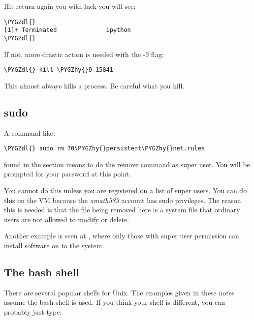\documentclass[letterpaper,10pt,english]{sphinxmanual}
\def\PYGZdl{\char`\$}
\def\PYGZhy{\char`\-}
\begin{document}
Hit return again you with luck you will see:

\begin{Verbatim}[commandchars=\\\{\}]
\PYGZdl{}
[1]+ Terminated              ipython
\PYGZdl{}
\end{Verbatim}

If not, more drastic action is needed with the -9 flag:

\begin{Verbatim}[commandchars=\\\{\}]
\PYGZdl{} kill \PYGZhy{}9 15841
\end{Verbatim}

This almost always kills a process.  Be careful what you kill.


\subsection{sudo}
\label{unix:sudo}\label{unix:id2}
A command like:

\begin{Verbatim}[commandchars=\\\{\}]
\PYGZdl{} sudo rm 70\PYGZhy{}persistent\PYGZhy{}net.rules
\end{Verbatim}

found in the section {\hyperref[vm:vm]{}} means to do the remove command as super user.
You will be prompted for your password at this point.

You cannot do this unless you are registered on a list of super users. You
can do this on the VM because the \emph{amath583} account has sudo privileges. The
reason this is needed is that the file being removed here is a system file
that ordinary users are not allowed to modify or delete.

Another example is seen at {\hyperref[software_installation:apt\string-get]{}}, where only those with super user
permission can install software on to the system.


\subsection{The bash shell}
\label{unix:bash}\label{unix:the-bash-shell}
There are several popular shells for Unix.  The examples given in these
notes assume the bash shell is used.  If you think your shell is different,
you can probably just type:
\end{document}
